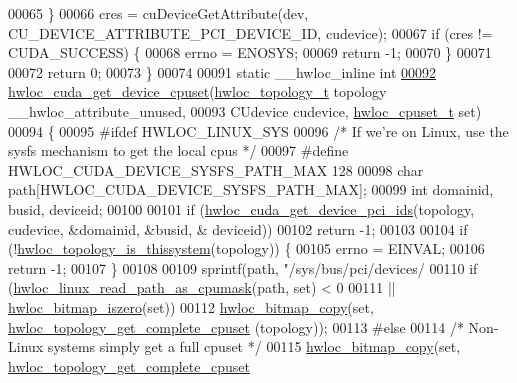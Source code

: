 \begin{DoxyCode}
00065   \}
00066   cres = cuDeviceGetAttribute(dev, CU\_DEVICE\_ATTRIBUTE\_PCI\_DEVICE\_ID, cudevice);
00067   \textcolor{keywordflow}{if} (cres != CUDA\_SUCCESS) \{
00068     errno = ENOSYS;
00069     \textcolor{keywordflow}{return} -1;
00070   \}
00071 
00072   \textcolor{keywordflow}{return} 0;
00073 \}
00074 
00091 \textcolor{keyword}{static} \_\_hwloc\_inline \textcolor{keywordtype}{int}
\hyperlink{a00219_gaec41c6b4dc3361156beb7dea2a74f5a3}{00092} \hyperlink{a00219_gaec41c6b4dc3361156beb7dea2a74f5a3}{hwloc\_cuda\_get\_device\_cpuset}(\hyperlink{a00186_ga9d1e76ee15a7dee158b786c30b6a6e38}{hwloc\_topology\_t} topology 
      \_\_hwloc\_attribute\_unused,
00093                              CUdevice cudevice, \hyperlink{a00183_ga4bbf39b68b6f568fb92739e7c0ea7801}{hwloc\_cpuset\_t} \textcolor{keyword}{set})
00094 \{
00095 \textcolor{preprocessor}{#ifdef HWLOC\_LINUX\_SYS}
00096   \textcolor{comment}{/* If we're on Linux, use the sysfs mechanism to get the local cpus */}
00097 \textcolor{preprocessor}{#define HWLOC\_CUDA\_DEVICE\_SYSFS\_PATH\_MAX 128}
00098   \textcolor{keywordtype}{char} path[HWLOC\_CUDA\_DEVICE\_SYSFS\_PATH\_MAX];
00099   \textcolor{keywordtype}{int} domainid, busid, deviceid;
00100 
00101   \textcolor{keywordflow}{if} (\hyperlink{a00219_ga1084285e8ff8b7df91c28917637481c6}{hwloc\_cuda\_get\_device\_pci\_ids}(topology, cudevice, &domainid, &busid, &
      deviceid))
00102     \textcolor{keywordflow}{return} -1;
00103 
00104   \textcolor{keywordflow}{if} (!\hyperlink{a00193_ga68ffdcfd9175cdf40709801092f18017}{hwloc\_topology\_is\_thissystem}(topology)) \{
00105     errno = EINVAL;
00106     \textcolor{keywordflow}{return} -1;
00107   \}
00108 
00109   sprintf(path, \textcolor{stringliteral}{"/sys/bus/pci/devices/%
00110   \textcolor{keywordflow}{if} (\hyperlink{a00214_gaf72d83e273803226ce772973e37b85de}{hwloc\_linux\_read\_path\_as\_cpumask}(path, \textcolor{keyword}{set}) < 0
00111       || \hyperlink{a00205_ga5b64be28f5a7176ed8ad0d6a90bdf108}{hwloc\_bitmap\_iszero}(\textcolor{keyword}{set}))
00112     \hyperlink{a00205_ga72a29824798b48784b8217471ec8f14c}{hwloc\_bitmap\_copy}(\textcolor{keyword}{set}, \hyperlink{a00202_gaee30e03391c1ed7dfd617fb5c7bbb033}{hwloc\_topology\_get\_complete\_cpuset}
      (topology));
00113 \textcolor{preprocessor}{#else}
00114   \textcolor{comment}{/* Non-Linux systems simply get a full cpuset */}
00115   \hyperlink{a00205_ga72a29824798b48784b8217471ec8f14c}{hwloc\_bitmap\_copy}(\textcolor{keyword}{set}, \hyperlink{a00202_gaee30e03391c1ed7dfd617fb5c7bbb033}{hwloc\_topology\_get\_complete\_cpuset}
}
\end{DoxyCode}
